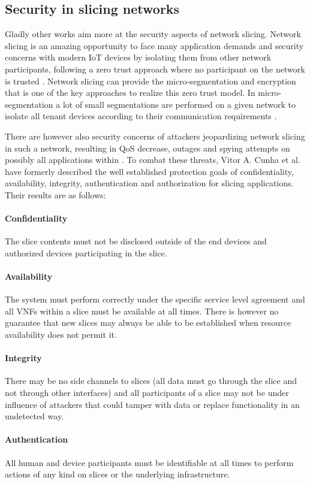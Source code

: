 \subsection{Security in slicing networks}
Gladly other works aim more at the security aspects of network slicing. Network slicing is an amazing opportunity to face many application demands and security concerns with modern IoT devices by isolating them from other network participants, following a zero trust approach where no participant on the network is trusted \cite{zerotrust}. Network slicing can provide the micro-segmentation and encryption that is one of the key approaches to realize this zero trust model. In micro-segmentation a lot of small segmentations are performed on a given network to isolate all tenant devices according to their communication requirements \cite{zerotrust}.

There are however also security concerns of attackers jeopardizing network slicing in such a network, resulting in QoS decrease, outages and spying attempts on possibly all applications within \cite{SE1}. To combat these threats, Vitor A. Cunha et al. \cite{SE1} have formerly described the well established protection goals of confidentiality, availability, integrity, authentication and authorization for slicing applications. Their results are as follows:
\paragraph{Confidentiality} The slice contents must not be disclosed outside of the end devices and authorized devices participating in the slice.
\paragraph{Availability} The system must perform correctly under the specific service level agreement and all VNFs within a slice must be available at all times. There is however no guarantee that new slices may always be able to be established when resource availability does not permit it.
\paragraph{Integrity} There may be no side channels to slices (all data must go through the slice and not through other interfaces) and all participants of a slice may not be under influence of attackers that could tamper with data or replace functionality in an undetected way.
\paragraph{Authentication} All human and device participants must be identifiable at all times to perform actions of any kind on slices or the underlying infrastructure.
